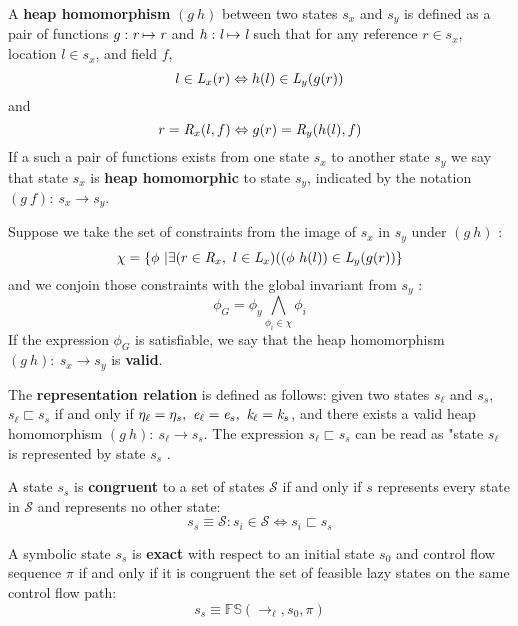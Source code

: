 \begin{definition}
A \textbf{heap homomorphism} $(g\ h)$ between two states $s_x$ and $s_y$ is defined as a pair of functions $g:\emph{r} \mapsto \emph{r}$ and $h:\emph{l} \mapsto \emph{l}$ such that for any reference $r \in s_x$, location $l \in s_x$, and field $f$, $$ l \in \emph{L}_x(r) \Leftrightarrow h(l)\in \emph{L}_y(g(r))$$ and $$ r = \emph{R}_x(l,f) \Leftrightarrow g(r) = \emph{R}_y(h(l),f)$$ If a such a pair of functions exists from one state $s_x$ to another state $s_y$ we say that state $s_x$ is \textbf{heap homomorphic} to state $s_y$, indicated by the notation $(g\ f):\ s_x \rightarrow s_y$. 

Suppose we take the set of constraints from the image of $s_x$ in $s_y$ under $(g\ h)$ :
$$\chi = \{ \phi\ | \exists (r \in \emph{R}_x,\  l \in \emph{L}_x) ( (\phi\ h(l)) \in \emph{L}_y (g(r))  \}$$ and we conjoin those constraints with the global invariant from $s_y$ :
$$\phi_G = \phi_y \bigwedge_{\phi_i \in \chi} \phi_i $$
 If the expression $\phi_G$ is satisfiable, we say that the heap homomorphism $(g\ h):\ s_x \rightarrow s_y $ is \textbf{valid}.
\end{definition}
\begin{definition}
The \textbf{representation relation} is defined as follows: given two states $s_\ell$ and $s_s$, $s_\ell \sqsubset s_s $ if and only if $\eta_{\ell} = \eta_{s} ,\ \cfgnt{e}_{\ell} = \cfgnt{e}_{s} ,\ \cfgnt{k}_{\ell} = \cfgnt{k}_{s}$, and there exists a valid heap homomorphism $(g\ h):\ s_\ell \rightarrow s_s $. The expression $s_\ell \sqsubset s_s $ can be read as "state $s_\ell$ is represented by state $s_s$ . 
\end{definition}

\begin{definition}
A state $s_s$ is \textbf{congruent} to a set of states $\mathcal{S}$ if and only if $s$ represents every state in $\mathcal{S}$ and represents no other state: 
$$ s_s \equiv \mathcal{S} : s_i \in \mathcal{S} \Leftrightarrow s_i \sqsubset s_s $$
\end{definition}

\begin{definition}
A symbolic state $s_s$ is \textbf{exact} with respect to an initial state $s_0$ and control flow sequence $\pi$ if and only if it is congruent the set of feasible lazy states on the same control flow path:
$$ s_s \equiv \mathbb{FS}(\rightarrow_{\ell},s_0,\pi)$$
\end{definition}

